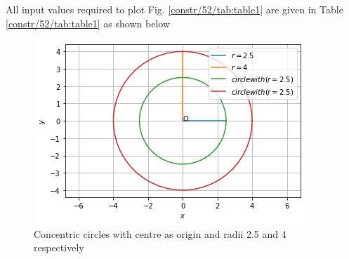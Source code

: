 

All input values required to plot Fig. \ref{constr/52/tab:table1} are given in Table \ref{constr/52/tab:table1} as shown below

\begin{table}[!ht]
\begin{center}
\end{center}
\caption{Input values}
\label{constr/52/tab:table1}
\end{table}


\begin{figure}[!ht]
\centering
\includegraphics[width=\columnwidth]{solutions/52/Figure3.png}
\caption{Concentric circles with centre as origin and radii 2.5 and 4 respectively}
\label{constr/52/fig:circle}	
\end{figure}


